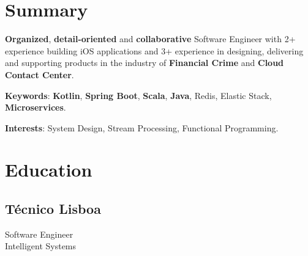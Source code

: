 \documentclass[letterpaper]{deedy-resume} %
\begin{document}
\begin{minipage}[t]{0.33\textwidth} %


\section{Summary}

\textbf{Organized}, \textbf{detail-oriented} and \textbf{collaborative} Software Engineer with 2+ experience building iOS applications and 3+ experience in designing, delivering and supporting products in the industry of \textbf{Financial Crime} and \textbf{Cloud Contact Center}.

\vspace{\topsep}

\textbf{Keywords}: \textbf{Kotlin}, \textbf{Spring Boot}, \textbf{Scala}, \textbf{Java}, Redis, Elastic Stack, \textbf{Microservices}.

\vspace{\topsep}

\textbf{Interests}: System Design, Stream Processing, Functional Programming.

\section{Education} 

\subsection{Técnico Lisboa}

Software Engineer\\
Intelligent Systems \\
\vspace{\topsep}
\vspace{\topsep}

\sectionspace %


\vspace{\topsep}


\end{minipage}
\end{document}
